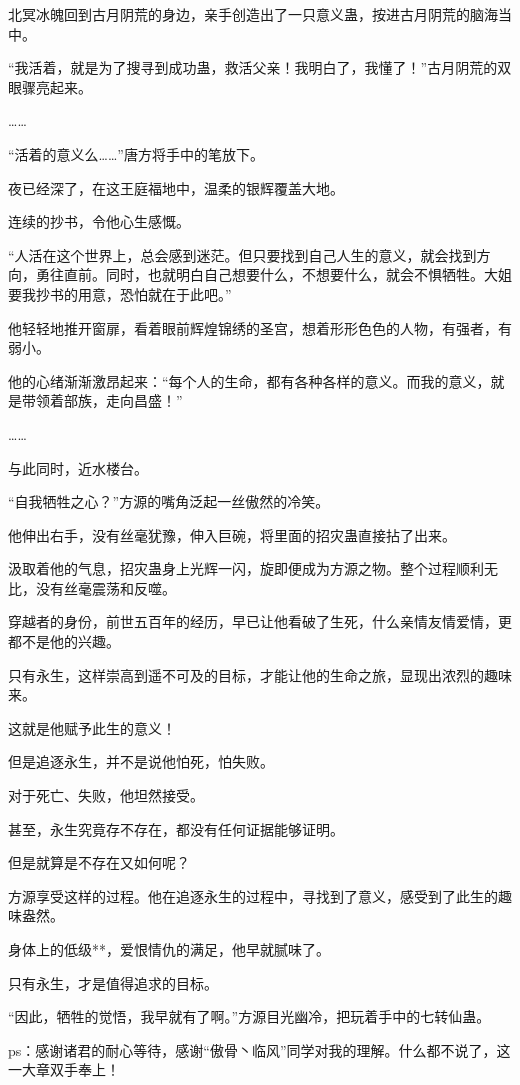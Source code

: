 \begin{this_body}
北冥冰魄回到古月阴荒的身边，亲手创造出了一只意义蛊，按进古月阴荒的脑海当中。

“我活着，就是为了搜寻到成功蛊，救活父亲！我明白了，我懂了！”古月阴荒的双眼骤亮起来。

……

“活着的意义么……”唐方将手中的笔放下。

夜已经深了，在这王庭福地中，温柔的银辉覆盖大地。

连续的抄书，令他心生感慨。

“人活在这个世界上，总会感到迷茫。但只要找到自己人生的意义，就会找到方向，勇往直前。同时，也就明白自己想要什么，不想要什么，就会不惧牺牲。大姐要我抄书的用意，恐怕就在于此吧。”

他轻轻地推开窗扉，看着眼前辉煌锦绣的圣宫，想着形形色色的人物，有强者，有弱小。

他的心绪渐渐激昂起来：“每个人的生命，都有各种各样的意义。而我的意义，就是带领着部族，走向昌盛！”

……

与此同时，近水楼台。

“自我牺牲之心？”方源的嘴角泛起一丝傲然的冷笑。

他伸出右手，没有丝毫犹豫，伸入巨碗，将里面的招灾蛊直接拈了出来。

汲取着他的气息，招灾蛊身上光辉一闪，旋即便成为方源之物。整个过程顺利无比，没有丝毫震荡和反噬。

穿越者的身份，前世五百年的经历，早已让他看破了生死，什么亲情友情爱情，更都不是他的兴趣。

只有永生，这样崇高到遥不可及的目标，才能让他的生命之旅，显现出浓烈的趣味来。

这就是他赋予此生的意义！

但是追逐永生，并不是说他怕死，怕失败。

对于死亡、失败，他坦然接受。

甚至，永生究竟存不存在，都没有任何证据能够证明。

但是就算是不存在又如何呢？

方源享受这样的过程。他在追逐永生的过程中，寻找到了意义，感受到了此生的趣味盎然。

身体上的低级**，爱恨情仇的满足，他早就腻味了。

只有永生，才是值得追求的目标。

“因此，牺牲的觉悟，我早就有了啊。”方源目光幽冷，把玩着手中的七转仙蛊。

ps：感谢诸君的耐心等待，感谢“傲骨丶临风”同学对我的理解。什么都不说了，这一大章双手奉上！

\end{this_body}

